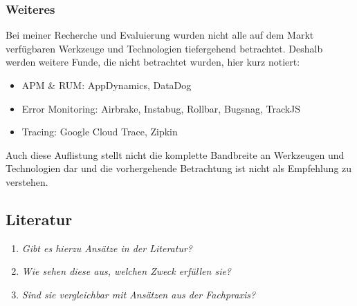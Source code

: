 \subsubsection{Weiteres}

Bei meiner Recherche und Evaluierung wurden nicht alle auf dem Markt verfügbaren Werkzeuge und Technologien tiefergehend betrachtet. Deshalb werden weitere Funde, die nicht betrachtet wurden, hier kurz notiert:

\begin{itemize}
	\item APM \& RUM: AppDynamics, DataDog
	\item Error Monitoring: Airbrake, Instabug, Rollbar, Bugsnag, TrackJS
	\item Tracing: Google Cloud Trace, Zipkin
\end{itemize}

Auch diese Auflistung stellt nicht die komplette Bandbreite an Werkzeugen und Technologien dar und die vorhergehende Betrachtung ist nicht als Empfehlung zu verstehen.

\subsection{Literatur}

\begin{enumerate}
	\item \textit{Gibt es hierzu Ansätze in der Literatur?}
	\item \textit{Wie sehen diese aus, welchen Zweck erfüllen sie?}
	\item \textit{Sind sie vergleichbar mit Ansätzen aus der Fachpraxis?}
\end{enumerate}
